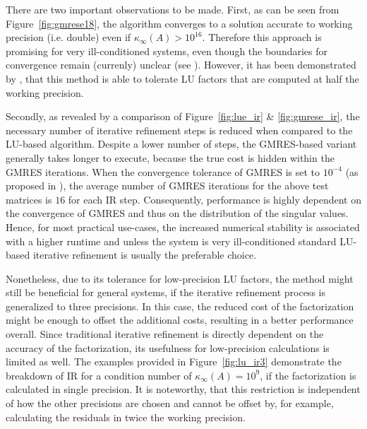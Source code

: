 There are two important observations to be made. First, as can be seen from Figure~\hyperref[fig:gmrese18]{\ref{fig:gmrese18}}, the algorithm converges to a solution accurate to working precision (i.e. double) even if $\kappa_\infty(A) > 10^{16}$. Therefore this approach is promising for very ill-conditioned systems, even though the boundaries for convergence remain (currenly) unclear (see \cite{carson_new_2017}). However, it has been demonstrated by \cite{carson_accelerating_2018}, that this method is able to tolerate LU factors that are computed at half the working precision. 

Secondly, as revealed by a comparison of Figure~\hyperref[fig:lue_ir]{\ref{fig:lue_ir}} \& \hyperref[fig:gmrese_ir]{\ref{fig:gmrese_ir}}, the necessary number of iterative refinement steps is reduced when compared to the LU-based algorithm. Despite a lower number of steps, the GMRES-based variant generally takes longer to execute, because the true cost is hidden within the GMRES iterations. When the convergence tolerance of GMRES is set to $10^{-4}$ (as proposed in \cite{carson_new_2017}), the average number of GMRES iterations for the above test matrices is $16$ for each IR step. Consequently, performance is highly dependent on the convergence of GMRES and thus on the distribution of the singular values. Hence, for most practical use-cases, the increased numerical stability is associated with a higher runtime and unless the system is very ill-conditioned standard LU-based iterative refinement is usually the preferable choice.

Nonetheless, due to its tolerance for low-precision LU factors, the method might still be beneficial for general systems, if the iterative refinement process is generalized to three precisions. In this case, the reduced cost of the factorization might be enough to offset the additional costs, resulting in a better performance overall. Since traditional iterative refinement is directly dependent on the accuracy of the factorization, its usefulness for low-precision calculations is limited as well. The examples provided in Figure~\hyperref[fig:lu_ir3]{\ref{fig:lu_ir3}} demonstrate the breakdown of IR for a condition number of $\kappa_\infty (A)=10^9$, if the factorization is calculated in single precision. It is noteworthy, that this restriction is independent of how the other precisions are chosen and cannot be offset by, for example, calculating the residuals in twice the working precision.

